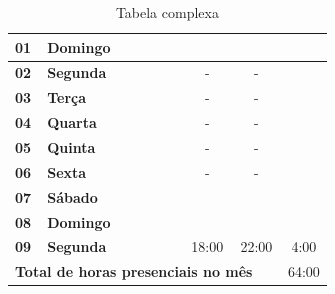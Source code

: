 \documentclass[a4paper, portugues,11pt]{article}
\begin{document}
\begin{table}[htb]
\begin{center}
\begin{tabular}{|l|l||c|c|c|c|c|c|c|}
  {\bf 01} & {\bf Domingo} & \colorbox{Gray}{\hspace{6mm}} & \colorbox{Gray}{\hspace{6mm}} & \colorbox{Gray}{\hspace{6mm}} & \colorbox{Blue}{\hspace{6mm}} & \colorbox{Gray}{\hspace{6mm}} & \colorbox{Gray}{\hspace{6mm}} & \colorbox{Gray}{\hspace{9mm}}  \\ \hline 
  {\bf 02} & {\bf Segunda} &  &  &  &  & - & - &   \\ \hline
  {\bf 03} & {\bf Terça} &  &  &  &  &  - & - &  \\ \hline 
  {\bf 04} & {\bf Quarta} &  &  &  &  &  - & - &  \\ \hline  
  {\bf 05} & {\bf Quinta} &  &  &  &  &  - & - &  \\ \hline
  {\bf 06} & {\bf Sexta} &  &  &  &  &  - & - &  \\ \hline
  {\bf 07} & {\bf Sábado} & \colorbox{Gray}{\hspace{6mm}} & \colorbox{Gray}{\hspace{6mm}} & \colorbox{Gray}{\hspace{6mm}} & \colorbox{Gray}{\hspace{6mm}} & \colorbox{Gray}{\hspace{6mm}} & \colorbox{Gray}{\hspace{6mm}} & \colorbox{Gray}{\hspace{9mm}}  \\ \hline 
  {\bf 08} & {\bf Domingo} & \colorbox{Gray}{\hspace{6mm}} & \colorbox{Gray}{\hspace{6mm}} & \colorbox{Gray}{\hspace{6mm}} & \colorbox{Gray}{\hspace{6mm}} & \colorbox{Gray}{\hspace{6mm}} & \colorbox{Gray}{\hspace{6mm}} & \colorbox{Gray}{\hspace{9mm}}  \\ \hline 
  {\bf 09} & {\bf Segunda} &  &  &  &  &  18:00 & 22:00 &  4:00 \\ \hline \cline{1-09}
  \multicolumn{8}{|r|}{\bf Total de horas presenciais no mês \ \ } & 64:00 \\ \hline
  \end{tabular}
  \caption{Tabela complexa} \label{tab:comp}
  \end{center}
  \end{table}
\end{document}
